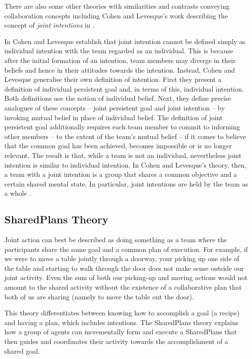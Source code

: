 \documentclass[11pt]{article}
\begin{document}
There are also some other theories with similarities and contrasts conveying
collaboration concepts including Cohen and Levesque's work describing the
concept of \textit{joint intentions} in \cite{cohen:teamwork,
levesque:acting-together}.

In \cite{cohen:teamwork} Cohen and Levesque establish that joint intention
cannot be defined simply as individual intention with the team regarded as an
individual. This is because after the initial formation of an intention, team
members may diverge in their beliefs and hence in their attitudes towards the
intention. Instead, Cohen and Levesque generalise their own definition of
intention. First they present a definition of individual persistent goal and, in
terms of this, individual intention. Both definitions use the notion of
individual belief. Next, they define precise analogues of these concepts --
joint persistent goal and joint intention -- by invoking mutual belief in place
of individual belief. The definition of joint persistent goal additionally
requires each team member to commit to informing other members -- to the extent
of the team's mutual belief -- if it comes to believe that the common goal has
been achieved, becomes impossible or is no longer relevant. The result is that,
while a team is not an individual, nevertheless joint intention is similar to
individual intention. In Cohen and Levesque's theory, then, a team with a joint
intention is a group that shares a common objective and a certain shared mental
state. In particular, joint intentions are held by the team as a whole
\cite{jarvis:teams-multiagent-systems}.

\subsection{SharedPlans Theory}
\label{sec:sharedplans}

Joint action can best be described as doing something as a team where the
participants share the same goal and a common plan of execution. For example, if
we were to move a table jointly through a doorway, your picking up one side of
the table and starting to walk through the door does not make sense outside our
joint activity. Even the sum of both our picking-up and moving actions would not
amount to the shared activity without the existence of a collaborative plan that
both of us are sharing (namely to move the table out the door).

This theory differentiates between knowing how to accomplish a goal (a recipe)
and having a plan, which includes intentions. The SharedPlans theory explains
how a group of agents can incrementally form and execute a SharedPlans that then
guides and coordinates their activity towards the accomplishment of a shared
goal.
\end{document}
